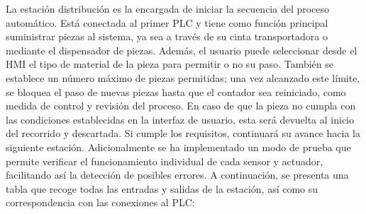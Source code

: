 La estación distribución es la encargada de iniciar la secuencia del proceso automático. Está conectada al primer PLC y tiene como función principal suministrar piezas al sistema, ya sea a través de su cinta transportadora o mediante el dispensador de piezas. Además, el usuario puede seleccionar desde el HMI el tipo de material de la pieza para permitir o no su paso. También se establece un número máximo de piezas permitidas; una vez alcanzado este límite, se bloquea el paso de nuevas piezas hasta que el contador sea reiniciado, como medida de control y revisión del proceso. En caso de que la pieza no cumpla con las condiciones establecidas en la interfaz de usuario, esta será devuelta al inicio del recorrido y descartada. Si cumple los requisitos, continuará su avance hacia la siguiente estación. Adicionalmente se ha implementado un modo de prueba que permite verificar el funcionamiento individual de cada sensor y actuador, facilitando así la detección de posibles errores. A continuación, se presenta una tabla que recoge todas las entradas y salidas de la estación, así como su correspondencia con las conexiones al PLC:

